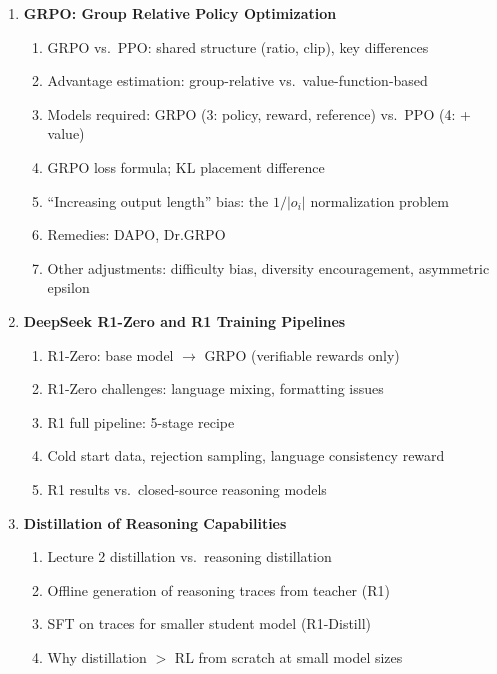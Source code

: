 \documentclass[11pt, a4paper]{article}
\begin{document}
\begin{enumerate}[label=\textbf{\arabic*.}, leftmargin=2em]
  \item \textbf{GRPO: Group Relative Policy Optimization}
    \begin{enumerate}[label=\arabic{enumi}.\arabic*]
      \item GRPO vs.\ PPO: shared structure (ratio, clip), key differences
      \item Advantage estimation: group-relative vs.\ value-function-based
      \item Models required: GRPO (3: policy, reward, reference) vs.\ PPO (4: + value)
      \item GRPO loss formula; KL placement difference
      \item ``Increasing output length'' bias: the $1/|o_i|$ normalization problem
      \item Remedies: DAPO, Dr.GRPO
      \item Other adjustments: difficulty bias, diversity encouragement, asymmetric epsilon
    \end{enumerate}

  \item \textbf{DeepSeek R1-Zero and R1 Training Pipelines}
    \begin{enumerate}[label=\arabic{enumi}.\arabic*]
      \item R1-Zero: base model $\to$ GRPO (verifiable rewards only)
      \item R1-Zero challenges: language mixing, formatting issues
      \item R1 full pipeline: 5-stage recipe
      \item Cold start data, rejection sampling, language consistency reward
      \item R1 results vs.\ closed-source reasoning models
    \end{enumerate}

  \item \textbf{Distillation of Reasoning Capabilities}
    \begin{enumerate}[label=\arabic{enumi}.\arabic*]
      \item Lecture 2 distillation vs.\ reasoning distillation
      \item Offline generation of reasoning traces from teacher (R1)
      \item SFT on traces for smaller student model (R1-Distill)
      \item Why distillation $>$ RL from scratch at small model sizes
    \end{enumerate}
\end{enumerate}
\end{document}
